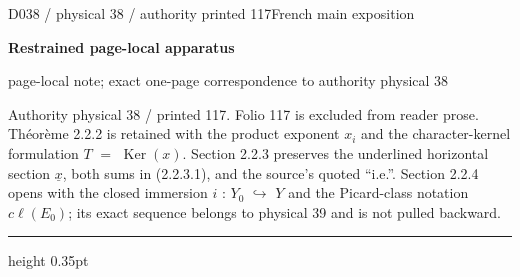 \documentclass[9pt]{article}
\newcommand{\CanonText}[1]{\par{\fontsize{8.0}{9.35}\selectfont\RaggedRight #1\par}\vspace{2.2pt}}
\newcommand{\LayerTitle}{Restrained page-local apparatus}
\begin{document}
\noindent\begin{minipage}[t][\dimexpr\textheight-5pt\relax][t]{\textwidth}
{\sffamily\fontsize{7.3}{8.2}\selectfont\color{Quiet} D038 / physical 38 / authority printed 117\hfill French main exposition}
\par{}\vspace{4.5pt}
{\sffamily\fontsize{10.4}{11.6}\selectfont\bfseries\color{Accent} \LayerTitle}
\par{\sffamily\fontsize{6.7}{7.7}\selectfont\color{Quiet} page-local note; exact one-page correspondence to authority physical 38}
\vspace{5pt}
\CanonText{Authority physical 38 / printed 117. Folio 117 is excluded from reader prose. Théorème 2.2.2 is retained with the product exponent \(x_{i}\) and the character-kernel formulation \(T\) \(=\) \(\operatorname{Ker}(x)\). Section 2.2.3 preserves the underlined horizontal section \(\underline{x}\), both sums in (2.2.3.1), and the source's quoted “i.e.”. Section 2.2.4 opens with the closed immersion \(i\) : \(Y_{0}\) \(\hookrightarrow{}\) \(Y\) and the Picard-class notation \(c\ell{}(E_{0})\); its exact sequence belongs to physical 39 and is not pulled backward.}
\vfill
{\color{Accent}\hrule height 0.35pt}\vspace{3pt}
\end{minipage}
\newpage
\end{document}
